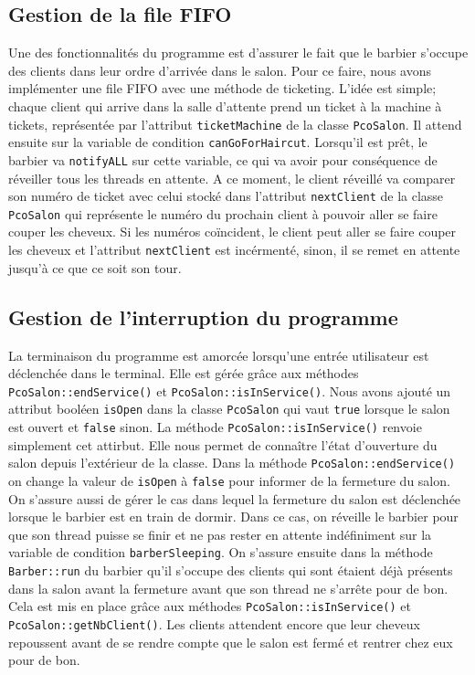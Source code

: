 \documentclass{article}
\begin{document}
\subsection*{Gestion de la file FIFO}

Une des fonctionnalités du programme est d'assurer le fait que le barbier s'occupe des clients dans leur ordre d'arrivée dans le salon. Pour ce faire,
nous avons implémenter une file FIFO avec une méthode de ticketing. L'idée est simple; chaque client qui arrive dans la salle d'attente prend un ticket à
la machine à tickets, représentée par l'attribut \texttt{ticketMachine} de la classe \texttt{PcoSalon}. Il attend ensuite sur la variable de condition 
\texttt{canGoForHaircut}. Lorsqu'il est prêt, le barbier va \texttt{notifyALL} sur cette variable, ce qui va avoir pour conséquence de réveiller tous les 
threads en attente. A ce moment, le client réveillé va comparer son numéro de ticket avec celui stocké dans l'attribut \texttt{nextClient} de la 
classe \texttt{PcoSalon} qui représente le numéro du prochain client à pouvoir aller se faire couper les cheveux. Si les numéros coïncident, le client
peut aller se faire couper les cheveux et l'attribut \texttt{nextClient} est incérmenté, sinon, il se remet en attente jusqu'à ce que ce soit son tour.  

\subsection*{Gestion de l'interruption du programme}

La terminaison du programme est amorcée lorsqu'une entrée utilisateur est déclenchée dans le terminal. Elle est gérée grâce aux méthodes 
\texttt{PcoSalon::endService()} et \texttt{PcoSalon::isInService()}. Nous avons ajouté un attribut booléen \texttt{isOpen} dans la classe \texttt{PcoSalon} 
qui vaut \texttt{true} lorsque le salon est ouvert et \texttt{false} sinon. La méthode \texttt{PcoSalon::isInService()} renvoie simplement cet attirbut. Elle nous
permet de connaître l'état d'ouverture du salon depuis l'extérieur de la classe. Dans la méthode \texttt{PcoSalon::endService()} on change la valeur de 
\texttt{isOpen} à \texttt{false} pour informer de la fermeture du salon. On s'assure aussi de gérer le cas dans lequel la fermeture du salon est 
déclenchée lorsque le barbier est en train de dormir. Dans ce cas, on réveille le barbier pour que son thread puisse se finir et ne pas rester en 
attente indéfiniment sur la variable de condition \texttt{barberSleeping}. 
On s'assure ensuite dans la méthode \texttt{Barber::run} du barbier qu'il s'occupe des clients qui sont étaient déjà présents dans la salon avant la
fermeture avant que son thread ne s'arrête pour de bon. Cela est mis en place grâce aux méthodes \texttt{PcoSalon::isInService()} et
\texttt{PcoSalon::getNbClient()}. Les clients attendent encore que leur cheveux repoussent avant de se rendre compte que le salon est fermé et rentrer 
chez eux pour de bon.
\end{document}
